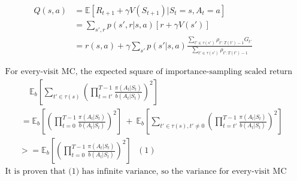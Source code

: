 \documentclass{article}
\begin{document}

\[
  \begin{aligned}
    Q(s, a) &= \mathbb{E}[R_{t+1} + \gamma V(S_{t+1}) | S_t=s, A_t=a]\\
    &=\sum_{s',r} p(s',r|s,a) [r + \gamma V(s')]\\
    &=r(s,a) + \gamma \sum_{s'} p(s'|s,a) \frac {\sum_{t'\in\tau(s')}\rho_{t':T(t')-1}G_{t'}}
                                                {\sum_{t'\in\tau(s')}\rho_{t':T(t')-1}}
  \end{aligned}
\]

\[
  \begin{aligned}
    &\text{ For every-visit MC, the expected square of importance-sampling scaled return for a state s is: } \\
    &\qquad \quad\ \mathbb{E}_b[\sum_{t'\in\tau(s)}(\prod_{t=t'}^{T-1} \frac {\pi(A_t|S_t)} {b(A_t|S_t)})^2]\\
    &\qquad \ = \mathbb{E}_b[(\prod_{t=0}^{T-1} \frac {\pi(A_t|S_t)} {b(A_t|S_t)})^2] \ + \
                \mathbb{E}_b[\sum_{t'\in\tau(s), t'\not=0}(\prod_{t=t'}^{T-1} \frac {\pi(A_t|S_t)} {b(A_t|S_t)})^2]\\
    &\qquad >=  \mathbb{E}_b[(\prod_{t=0}^{T-1} \frac {\pi(A_t|S_t)} {b(A_t|S_t)})^2] \ \ \ (1) \\
    &\text{ It is proven that (1) has infinite variance, so the variance for every-visit MC estimator is still infinite.} \\
  \end{aligned}
\]
\end{document}
